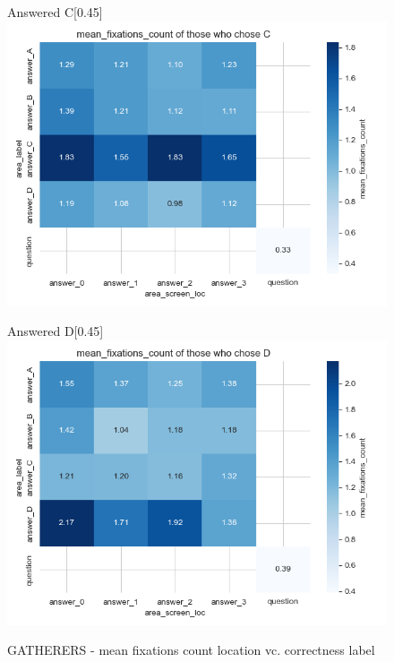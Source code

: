 \documentclass{article}
\begin{document}
\begin{figure}[H]
  \vspace{1em} %

  \begin{subcaptionbox}{Answered C\label{fig:C_fc_g}}[0.45\textwidth]
    {\centering\includegraphics[width=\linewidth]{plots/matrix_plots/matrix_mean_fixations_count_C_gatherers.png}}
  \end{subcaptionbox}
  \hfill
  \begin{subcaptionbox}{Answered D\label{fig:D_fc_g}}[0.45\textwidth]
    {\centering\includegraphics[width=\linewidth]{plots/matrix_plots/matrix_mean_fixations_count_D_gatherers.png}}
  \end{subcaptionbox}
  
  \caption{GATHERERS - mean fixations count location vc. correctness label}
  \label{fig:fourimages8}
\end{figure}
\end{document}

